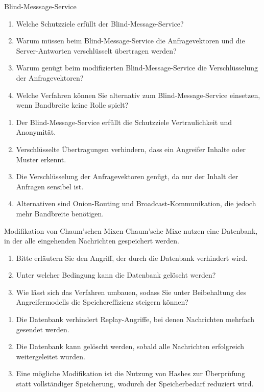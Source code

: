 \documentclass{article}
\begin{document}
\setcounter{subsection}{231}
\begin{exercise}{Blind-Messsage-Service}
  \begin{enumerate}
    \item Welche Schutzziele erfüllt der Blind-Message-Service?
    \item Warum müssen beim Blind-Message-Service die Anfragevektoren und die Server-Antworten verschlüsselt übertragen werden?
    \item Warum genügt beim modifizierten Blind-Message-Service die Verschlüsselung der Anfragevektoren?
    \item Welche Verfahren können Sie alternativ zum Blind-Message-Service einsetzen, wenn Bandbreite keine Rolle spielt?
  \end{enumerate}

  \begin{solution}
    \begin{enumerate}
      \item Der Blind-Message-Service erfüllt die Schutzziele Vertraulichkeit und Anonymität.
      \item Verschlüsselte Übertragungen verhindern, dass ein Angreifer Inhalte oder Muster erkennt.
      \item Die Verschlüsselung der Anfragevektoren genügt, da nur der Inhalt der Anfragen sensibel ist.
      \item Alternativen sind Onion-Routing und Broadcast-Kommunikation, die jedoch mehr Bandbreite benötigen.
    \end{enumerate}
  \end{solution}
\end{exercise}

\setcounter{subsection}{235}
\begin{exercise}{Modifikation von Chaum'schen Mixen}
  Chaum'sche Mixe nutzen eine Datenbank, in der alle eingehenden Nachrichten gespeichert werden.
  \begin{enumerate}
    \item Bitte erläutern Sie den Angriff, der durch die Datenbank verhindert wird.
    \item Unter welcher Bedingung kann die Datenbank gelöscht werden?
    \item Wie lässt sich das Verfahren umbauen, sodass Sie unter Beibehaltung des Angreifermodells die Speichereffizienz steigern können?
  \end{enumerate}

  \begin{solution}
    \begin{enumerate}
      \item Die Datenbank verhindert Replay-Angriffe, bei denen Nachrichten mehrfach gesendet werden.
      \item Die Datenbank kann gelöscht werden, sobald alle Nachrichten erfolgreich weitergeleitet wurden.
      \item Eine mögliche Modifikation ist die Nutzung von Hashes zur Überprüfung statt vollständiger Speicherung, wodurch der Speicherbedarf reduziert wird.
    \end{enumerate}
  \end{solution}
\end{exercise}
\end{document}
